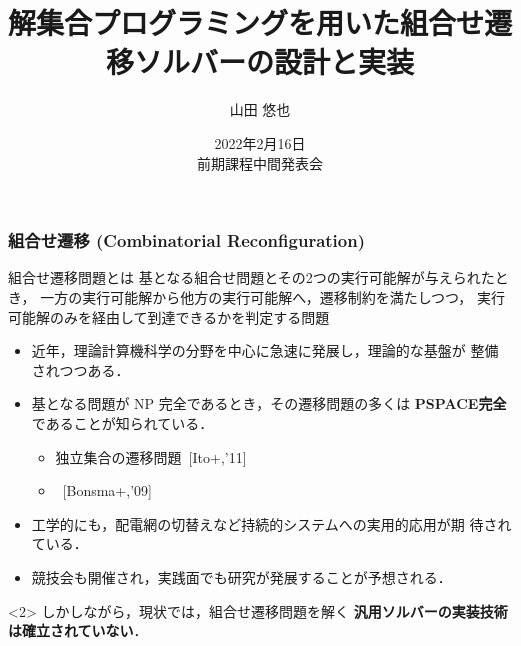 \documentclass[dvipdfmx,11pt]{beamer}
\title{解集合プログラミングを用いた組合せ遷移ソルバーの設計と実装}
\author{山田 悠也}
\date{2022年2月16日\\前期課程中間発表会}
\institute{番原研究室}
\begin{document}
\maketitle
\begin{frame}
  \frametitle{組合せ遷移 (Combinatorial Reconfiguration)}
  \begin{alertblock}{組合せ遷移問題とは}
    基となる組合せ問題とその2つの実行可能解が与えられたとき，
    一方の実行可能解から他方の実行可能解へ，遷移制約を満たしつつ，
    実行可能解のみを経由して到達できるかを判定する問題
  \end{alertblock}

  \begin{itemize}
  \item 近年，理論計算機科学の分野を中心に急速に発展し，理論的な基盤が
    整備されつつある\footnotemark[1]．
  \item 基となる問題が NP 完全であるとき，その遷移問題の多くは
    \alert{\bf PSPACE完全}であることが知られている．
    \begin{itemize}
    \item 独立集合の遷移問題~[Ito+,'11]
    \item {}~[Bonsma+,'09]
    \end{itemize}
  \item 工学的にも，配電網の切替えなど持続的システムへの実用的応用が期
    待されている．
  \item 競技会も開催され，実践面でも研究が発展することが予想される．
  \end{itemize}

  \begin{alertblock}<2>{}\centering
    しかしながら，現状では，組合せ遷移問題を解く
    \alert{\bf 汎用ソルバーの実装技術は確立されていない}．
  \end{alertblock}

\end{frame}
\end{document}
